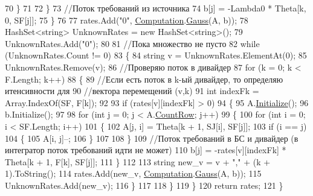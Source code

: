 \begin{DoxyCode}
70                     \}
71 
72                 \}
73                 \textcolor{comment}{//Поток требований из источника}
74                 b[j] = -Lambda0 * Theta[k, 0, SF[j]];
75             \}
76 
77             rates.Add(\textcolor{stringliteral}{"0"}, \hyperlink{class_b_l_a_s_1_1_computation}{Computation}.\hyperlink{class_b_l_a_s_1_1_computation_ac30bde9ba0a8f983730daa3fa0318e29}{Gauss}(A, b));
78             HashSet<string> UnknownRates = \textcolor{keyword}{new} HashSet<string>();
79             UnknownRates.Add(\textcolor{stringliteral}{"0"});
80 
81             \textcolor{comment}{//Пока множество не пусто }
82             \textcolor{keywordflow}{while} (UnknownRates.Count != 0)
83             \{
84                 \textcolor{keywordtype}{string} v = UnknownRates.ElementAt(0);
85                 UnknownRates.Remove(v);
86                 \textcolor{comment}{//Проверяю поток в дивайдер}
87                 \textcolor{keywordflow}{for} (k = 0; k < F.Length; k++)
88                 \{
89                     \textcolor{comment}{//Если есть поток в k-ый дивайдер, то определяю итенсивности для }
90                     \textcolor{comment}{//вектора перемещений (v,k)}
91                     \textcolor{keywordtype}{int} indexFk = Array.IndexOf(SF, F[k]);
92 
93                     \textcolor{keywordflow}{if} (rates[v][indexFk] > 0)
94                     \{
95                         A.\hyperlink{class_b_l_a_s_1_1_matrix_ac86fdeae6e5a0d2aa7475f432b85eed0}{Initialize}();
96                         b.Initialize();
97 
98                         \textcolor{keywordflow}{for} (\textcolor{keywordtype}{int} j = 0; j < A.\hyperlink{class_b_l_a_s_1_1_matrix_a511a107843f7d488a87a7f01a184e893}{CountRow}; j++)
99                         \{
100                             \textcolor{keywordflow}{for} (\textcolor{keywordtype}{int} i = 0; i < SF.Length; i++)
101                             \{
102                                 A[j, i] = Theta[k + 1, SJ[i], SF[j]];
103                                 \textcolor{keywordflow}{if} (i == j)
104                                 \{
105                                     A[i, j]--;
106                                 \}
107 
108                             \}
109                             \textcolor{comment}{//Поток требований в БС и дивайдер (в интегратор поток требований идти не
       может)}
110                             b[j] = -rates[v][indexFk] * Theta[k + 1, F[k], SF[j]];
111                         \}
112 
113                         \textcolor{keywordtype}{string} new\_v = v + \textcolor{stringliteral}{","} + (k + 1).ToString();
114                         rates.Add(new\_v, \hyperlink{class_b_l_a_s_1_1_computation}{Computation}.\hyperlink{class_b_l_a_s_1_1_computation_ac30bde9ba0a8f983730daa3fa0318e29}{Gauss}(A, b));
115                         UnknownRates.Add(new\_v);
116                     \}
117 
118                 \}
119             \}
120             \textcolor{keywordflow}{return} rates;
121         \}
\end{DoxyCode}
